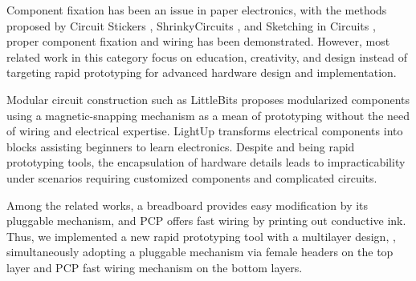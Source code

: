 
Component fixation has been an issue in paper electronics, with the methods proposed by Circuit Stickers \cite{Circuit_Stickers}, ShrinkyCircuits \cite{ShrinkyCircuits}, and Sketching in Circuits \cite{Sketching_in_Circuits}, proper component fixation and wiring has been demonstrated.
However, most related work in this category focus on education, creativity, and design instead of targeting rapid prototyping for advanced hardware design and implementation.


Modular circuit construction such as LittleBits \cite{LittleBits} proposes modularized components using a magnetic-snapping mechanism as a mean of prototyping without the need of wiring and electrical expertise.
LightUp \cite{LightUp} transforms electrical components into blocks assisting beginners to learn electronics.
Despite \cite{LittleBits} and \cite{LightUp} being rapid prototyping tools, the encapsulation of hardware details leads to impracticability under scenarios requiring customized components and complicated circuits.

Among the related works, a breadboard provides easy modification by its pluggable mechanism, and PCP offers fast wiring by printing out conductive ink. Thus, we implemented a new rapid prototyping tool with a multilayer design, \papertitle, simultaneously adopting a pluggable mechanism via female headers on the top layer and PCP fast wiring mechanism on the bottom layers. 

